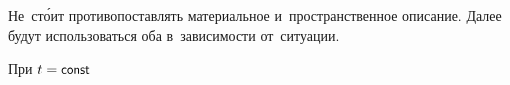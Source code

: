 \begin{otherlanguage}{russian}
\vspace{-0.1em} Не~ст\'{о}ит противопоставлять материальное и~пространственное описание. Далее будут использоваться оба в~зависимости от~ситуации.

\newpage



\label{para:motiongradient}

При ${t = \const}$


\end{otherlanguage}
